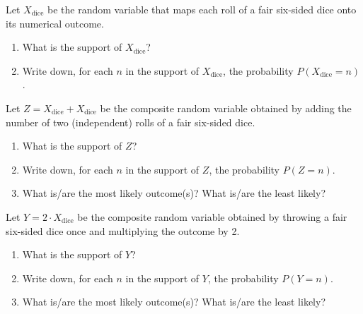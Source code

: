 \documentclass[nobib,nofonts]{tufte-handout}
\newcommand{\mult}{\ensuremath{\cdot}}
\begin{document}
\bigskip
\noindent \colorbox{mygray}{\centering
  \begin{minipage}{1.0\textwidth}

    \begin{exercise}
      Let $X_{\text{dice}}$ be the random variable that maps each roll of a fair six-sided dice onto its numerical outcome.
      \begin{enumerate}
        \item What is the support of $X_{\text{dice}}$?
        \item Write down, for each $n$ in the support of $X_{\text{dice}}$, the probability $P(X_{\text{dice}}=n)$.
      \end{enumerate}
    \end{exercise}

    \begin{exercise}
      Let $Z = X_{\text{dice}} + X_{\text{dice}}$ be the composite random variable obtained by adding the number of two (independent) rolls of a fair six-sided dice.
      \begin{enumerate}
        \item What is the support of $Z$?
        \item Write down, for each $n$ in the support of $Z$, the probability $P(Z=n)$.
        \item What is/are the most likely outcome(s)? What is/are the least likely?
      \end{enumerate}
    \end{exercise}

    \begin{exercise}
      Let $Y = 2 \mult X_{\text{dice}}$ be the composite random variable obtained by throwing a fair six-sided dice once and multiplying the outcome by 2.
      \begin{enumerate}
        \item What is the support of $Y$?
        \item Write down, for each $n$ in the support of $Y$, the probability $P(Y=n)$.
        \item What is/are the most likely outcome(s)? What is/are the least likely?
      \end{enumerate}
    \end{exercise}

  \end{minipage}
}


\end{document}
